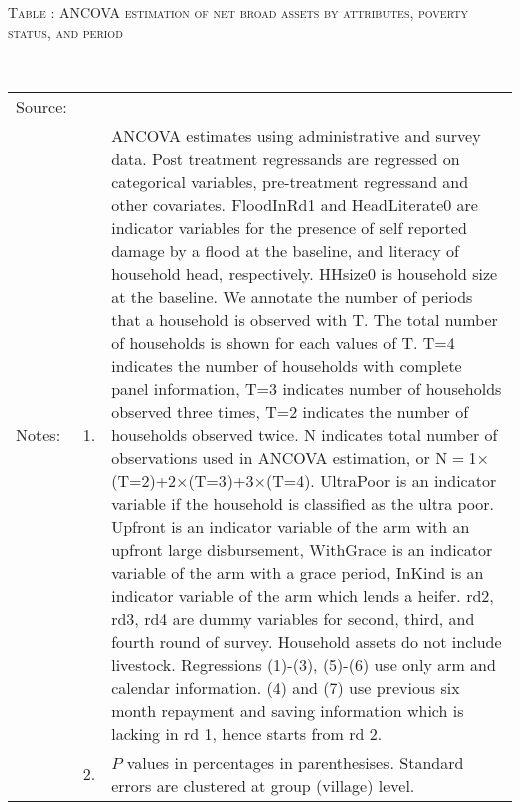 \hspace{-1cm}\begin{minipage}[t]{14cm}
\hfil\textsc{\normalsize Table \thetable: ANCOVA estimation of net broad assets by attributes, poverty status, and period\label{tab ANCOVA net broad assets timevarying poverty status attributes}}\\
\setlength{\tabcolsep}{1pt}
\setlength{\baselineskip}{8pt}
\renewcommand{\arraystretch}{.55}
\hfil{}\\
\renewcommand{\arraystretch}{.8}
\setlength{\tabcolsep}{1pt}
\begin{tabular}{>{\hfill\scriptsize}p{1cm}<{}>{\hfill\scriptsize}p{.25cm}<{}>{\scriptsize}p{12cm}<{\hfill}}
Source:& \multicolumn{2}{l}{\scriptsize Estimated with GUK administrative and survey data.}\\
Notes: & 1. & ANCOVA estimates using administrative and survey data. Post treatment regressands are regressed on categorical variables, pre-treatment regressand and other covariates. \textsf{FloodInRd1} and \textsf{HeadLiterate0} are indicator variables for the presence of self reported damage by a flood at the baseline, and literacy of household head, respectively. \textsf{HHsize0} is household size at the baseline. We annotate the number of periods that a household is observed with \textsf{T}. The total number of households is shown for each values of \textsf{T}. \textsf{T=4} indicates the number of households with complete panel information, \textsf{T=3} indicates number of households observed three times, \textsf{T=2} indicates the number of households observed twice. \textsf{N} indicates total number of observations used in ANCOVA estimation, or \textsf{N$=$1$\times$(T=2)+2$\times$(T=3)+3$\times$(T=4)}.  \textsf{UltraPoor} is an indicator variable if the household is classified as the ultra poor. \textsf{Upfront} is an indicator variable of the arm with an upfront large disbursement, \textsf{WithGrace} is an indicator variable of the arm with a grace period, \textsf{InKind} is an indicator variable of the arm which lends a heifer. \textsf{rd2, rd3, rd4} are dummy variables for second, third, and fourth round of survey. Household assets do not include livestock. Regressions (1)-(3), (5)-(6) use only arm and calendar information. (4) and (7) use previous six month repayment and saving information which is lacking in rd 1, hence starts from rd 2.\\
& 2. & $P$ values in percentages in parenthesises. Standard errors are clustered at group (village) level.
\end{tabular}
\end{minipage}



